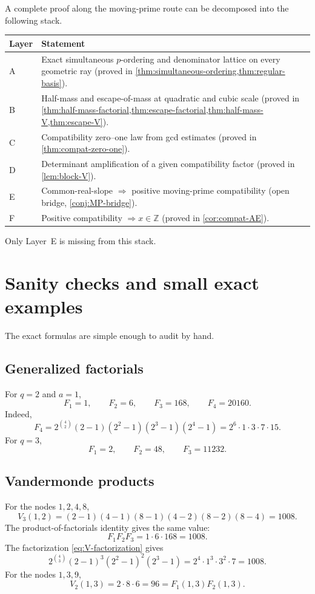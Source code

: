 \documentclass[11pt]{article}
\theoremstyle{definition}
\theoremstyle{remark}
\newcommand{\Z}{\mathbb Z}
\begin{document}
A complete proof along the moving-prime route can be decomposed into the
following stack.
\begin{longtable}{@{}p{}p{}@{}}
\toprule
Layer & Statement \\
\midrule
\endhead
A & Exact simultaneous $p$-ordering and denominator lattice on every
    geometric ray (proved in \cref{thm:simultaneous-ordering,thm:regular-basis}).\\
B & Half-mass and escape-of-mass at quadratic and cubic scale
    (proved in \cref{thm:half-mass-factorial,thm:escape-factorial,thm:half-mass-V,thm:escape-V}).\\
C & Compatibility zero--one law from gcd estimates
    (proved in \cref{thm:compat-zero-one}).\\
D & Determinant amplification of a given compatibility factor
    (proved in \cref{lem:block-V}).\\
E & Common-real-slope $\Rightarrow$ positive moving-prime compatibility
    (open bridge, \cref{conj:MP-bridge}).\\
F & Positive compatibility $\Rightarrow x\in\Z$
    (proved in \cref{cor:compat-AE}).\\
\bottomrule
\end{longtable}
Only Layer~E is missing from this stack.

\section{Sanity checks and small exact examples}

The exact formulas are simple enough to audit by hand.

\subsection{Generalized factorials}

For $q=2$ and $a=1$,
\[
 F_1=1,\qquad F_2=6,\qquad F_3=168,\qquad F_4=20160.
\]
Indeed,
\[
 F_4=2^{\binom42}(2-1)(2^2-1)(2^3-1)(2^4-1)
     =2^6\cdot1\cdot3\cdot7\cdot15.
\]
For $q=3$,
\[
 F_1=2,\qquad F_2=48,\qquad F_3=11232.
\]

\subsection{Vandermonde products}

For the nodes $1,2,4,8$,
\[
 V_3(1,2)
 =(2-1)(4-1)(8-1)(4-2)(8-2)(8-4)=1008.
\]
The product-of-factorials identity gives the same value:
\[
 F_1F_2F_3=1\cdot6\cdot168=1008.
\]
The factorization \eqref{eq:V-factorization} gives
\[
 2^{\binom43}(2-1)^3(2^2-1)^2(2^3-1)
 =2^4\cdot1^3\cdot3^2\cdot7=1008.
\]
For the nodes $1,3,9$,
\[
 V_2(1,3)=2\cdot8\cdot6=96=F_1(1,3)F_2(1,3).
\]
\end{document}
